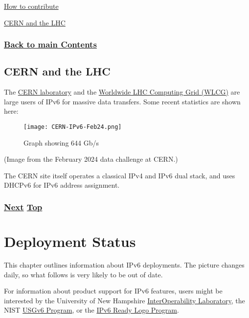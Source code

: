 \documentclass[
]{article}
\begin{document}
\href{https://github.com/becarpenter/book6/blob/main/1.\%20Introduction\%20and\%20Foreword/How\%20to\%20contribute.md\#how-to-contribute}{How
to contribute}

\hyperref[cern-and-the-lhc]{CERN and the LHC}

\subsubsection{\texorpdfstring{\hyperref[list-of-contents]{Back to main
Contents}}{Back to main Contents}}\label{back-to-main-contents-6}

\pagebreak

\subsection{CERN and the LHC}\label{cern-and-the-lhc}

The \href{https://www.cern.ch}{CERN laboratory} and the
\href{https://home.cern/science/computing/grid}{Worldwide LHC Computing
Grid (WLCG)} are large users of IPv6 for massive data transfers. Some
recent statistics are shown here:

\begin{figure}
\centering
\texttt{[image: CERN-IPv6-Feb24.png]}
\caption{Graph showing 644 Gb/s}
\end{figure}

(Image from the February 2024 data challenge at CERN.)

The CERN site itself operates a classical IPv4 and IPv6 dual stack, and
uses DHCPv6 for IPv6 address assignment.

\subsubsection{\texorpdfstring{\hyperref[deployment-status]{Next}
\hyperref[case-studies]{Top}}{Next Top}}\label{next-top-6}

\pagebreak

\section{Deployment Status}\label{deployment-status}

This chapter outlines information about IPv6 deployments. The picture
changes daily, so what follows is very likely to be out of date.

For information about product support for IPv6 features, users might be
interested by the University of New Hampshire
\href{https://www.iol.unh.edu/testing/ipv6}{InterOperability
Laboratory}, the NIST
\href{https://www.nist.gov/programs-projects/usgv6-program}{USGv6
Program}, or the \href{https://www.ipv6ready.org/}{IPv6 Ready Logo
Program}.
\end{document}
